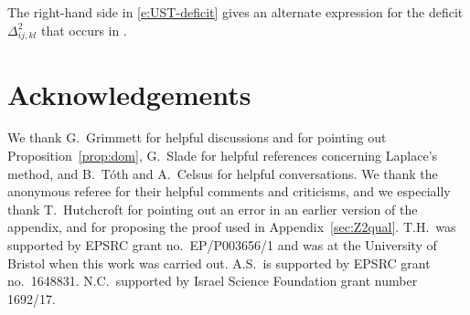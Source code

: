 \documentclass[11pt]{amsart}
\numberwithin{equation}{section}
\numberwithin{theorem}{section}
\begin{document}
\begin{remark}
  The right-hand side in \eqref{e:UST-deficit} gives an
    alternate expression for the deficit $\Delta_{ij,kl}^{2}$ that
    occurs in \cite[Theorem~2.1]{FM}.
\end{remark}


\section*{Acknowledgements}


We thank G.\ Grimmett for helpful discussions and for pointing out
Proposition~\ref{prop:dom}, G.\ Slade for helpful references
concerning Laplace's method, and B.\ T\'{o}th and A.\ Celsus for
helpful conversations.  We thank the anonymous referee for their
helpful comments and criticisms, and we especially thank T.\
Hutchcroft for pointing out an error in an earlier version of the
appendix, and for proposing the proof used in
Appendix~\ref{sec:Z2qual}.  T.H.\ was supported by EPSRC grant no.\
EP/P003656/1 and was at the University of Bristol when this work was
carried out. A.S.\ is supported by EPSRC grant no.\ 1648831.  N.C.\
{supported by Israel Science Foundation grant number 1692/17}.




\end{document}
